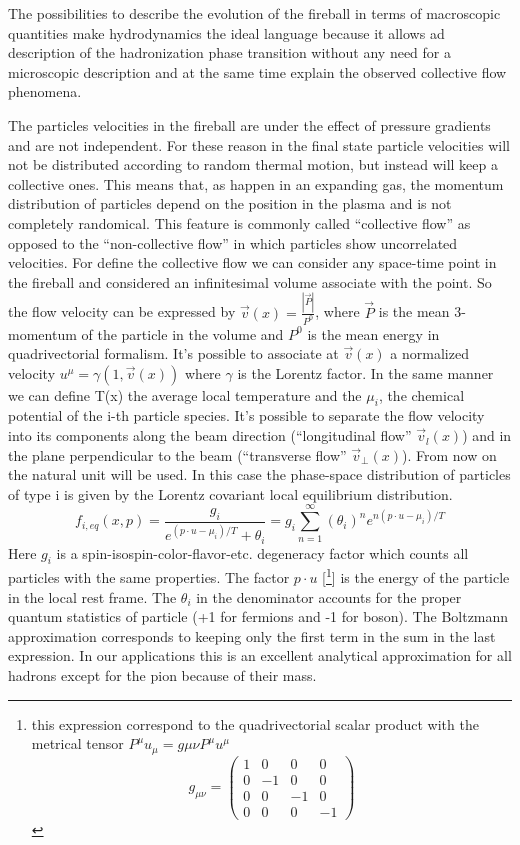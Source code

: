 \documentclass[12pt,a4paper]{book}
\begin{document}
	The possibilities to describe the evolution of the fireball in terms of macroscopic quantities make hydrodynamics the ideal language because it allows ad description of the hadronization phase transition without any need for a microscopic description and at the same time explain the observed collective flow phenomena.
	
	The particles velocities in the fireball are under the effect of pressure gradients and are not independent. For these reason in the final state particle velocities will not be distributed according to random thermal motion, but instead will keep a collective ones. This means that, as happen in an expanding gas, the momentum distribution of particles depend on the position in the plasma and is not completely randomical. This feature is commonly called “collective flow” as opposed to the “non-collective flow” in which particles show uncorrelated velocities. For define the collective flow we can consider any space-time point in the fireball and considered an infinitesimal volume associate with the point. So the flow velocity can be expressed by $\vec{v}(x) =\frac{|\vec{P}|}{P^0}$, where $\vec{P}$ is the mean 3-momentum of the particle in the volume and $P^0$ is the mean energy in quadrivectorial formalism. It's possible to associate at $\vec{v}(x)$ a normalized velocity $u^\mu=\gamma(1,\vec{v}(x))$ where $\gamma$ is the Lorentz factor. In the same manner we can define T(x) the average local temperature and the $\mu_i$, the chemical potential of the i-th particle species.  It's possible to separate the flow velocity into its components along the beam direction (“longitudinal flow” $\vec{v}_l(x)$) and in the plane perpendicular to the beam (“transverse flow” $\vec{v}_\perp(x)$). From now on the natural unit will be used. In this case the phase-space distribution of particles of type i is given by the Lorentz covariant local equilibrium distribution.
	\begin{equation}
		f_{i,eq}(x,p)=\frac{g_i}{e^{(p \cdot u - \mu_i)/T} + \theta_i} = g_i \sum_{n=1}^{\infty} (\theta_i)^{n} e^{n(p \cdot u - \mu_i)/T}
		\label{eq:boltzmann}
	\end{equation}
	Here $g_i$ is a spin-isospin-color-flavor-etc. degeneracy factor which counts all particles with the same properties. The factor $p \cdot u$ [\footnote{this expression correspond to the quadrivectorial scalar product with the metrical tensor $P^\mu u_\mu = g{\mu \nu} P^\mu u^\mu$ \[
		g_{\mu\nu} =
		\begin{pmatrix}
			1 & 0 & 0 & 0 \\
			0 & -1 & 0 & 0 \\
			0 & 0 & -1 & 0 \\
			0 & 0 & 0 & -1
		\end{pmatrix}
		\]}] is the energy of the particle in the local rest frame. The 	$\theta_i$ in the denominator accounts for the proper quantum statistics of particle (+1 for fermions and -1 for boson). The Boltzmann approximation corresponds to keeping only the first term in the sum in the last expression. In our applications this is an excellent analytical approximation for all hadrons except for the pion because of their mass.
	
\end{document}
